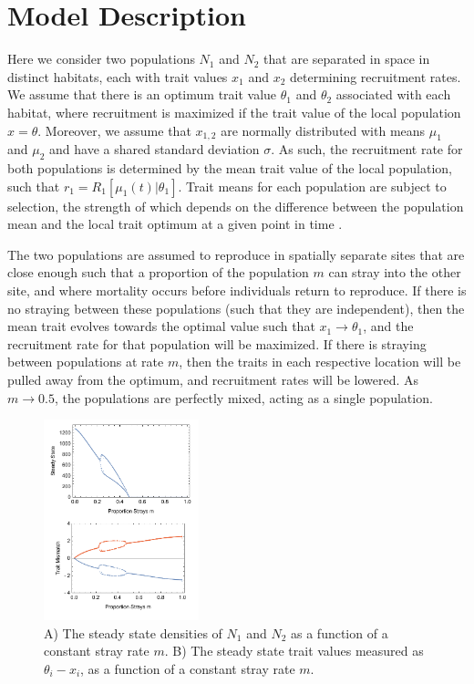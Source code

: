 \documentclass[twocolumn,preprintnumbers,amsmath,amssymb,superscriptaddress]{revtex4}
\begin{document}




\section{Model Description}

Here we consider two populations $N_1$ and $N_2$ that are separated in space in distinct habitats, each with trait values $x_1$ and $x_2$ determining recruitment rates.
We assume that there is an optimum trait value $\theta_1$ and $\theta_2$ associated with each habitat, where recruitment is maximized if the trait value of the local population $x = \theta$.
Moreover, we assume that $x_{1,2}$ are normally distributed with means $\mu_1$ and $\mu_2$ and have a shared standard deviation $\sigma$.
As such, the recruitment rate for both populations is determined by the mean trait value of the local population, such that $r_1 = R_1[\mu_1(t)|\theta_1]$.
Trait means for each population are subject to selection, the strength of which depends on the difference between the population mean and the local trait optimum at a given point in time \cite{simpson1953major,Lande:1976ga}.

The two populations are assumed to reproduce in spatially separate sites that are close enough such that a proportion of the population $m$ can stray into the other site, and where mortality occurs before individuals return to reproduce.
If there is no straying between these populations (such that they are independent), then the mean trait evolves towards the optimal value such that $x_1 \rightarrow \theta_1$, and the recruitment rate for that population will be maximized.
If there is straying between populations at rate $m$, then the traits in each respective location will be pulled away from the optimum, and recruitment rates will be lowered.
As $m \rightarrow 0.5$, the populations are perfectly mixed, acting as a single population.

\begin{figure}
  \captionsetup{justification=raggedright,
singlelinecheck=false
}
\centering
\includegraphics[width=0.4\textwidth]{figs2/fig_Density.pdf}
\caption{
A) The steady state densities of $N_1$ and $N_2$ as a function of a constant stray rate $m$.
B) The steady state trait values measured as $\theta_i - x_i$, as a function of a constant stray rate $m$. 
} \label{fig:traj}
\end{figure}
\end{document}
